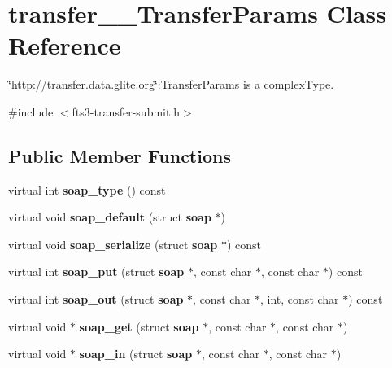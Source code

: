 \section{transfer\_\-\_\-TransferParams Class Reference}
\label{classtransfer____TransferParams}


\char`\"{}http://transfer.data.glite.org\char`\"{}:TransferParams is a complexType.  




{\ttfamily \#include $<$fts3-\/transfer-\/submit.h$>$}

\subsection*{Public Member Functions}
\begin{DoxyCompactItemize}
\item 
virtual int {\bfseries soap\_\-type} () const \label{classtransfer____TransferParams_acca6acc764bd1fe03ef2aefdce8b2e6c}

\item 
virtual void {\bfseries soap\_\-default} (struct {\bf soap} $\ast$)\label{classtransfer____TransferParams_aa85cbcf0c2d7405ef86e9fcbb5e975c4}

\item 
virtual void {\bfseries soap\_\-serialize} (struct {\bf soap} $\ast$) const \label{classtransfer____TransferParams_afb6351523ca0b245c6a085215bd2a15e}

\item 
virtual int {\bfseries soap\_\-put} (struct {\bf soap} $\ast$, const char $\ast$, const char $\ast$) const \label{classtransfer____TransferParams_a9d494d69d5fc18e6641f6bbae96a6cc0}

\item 
virtual int {\bfseries soap\_\-out} (struct {\bf soap} $\ast$, const char $\ast$, int, const char $\ast$) const \label{classtransfer____TransferParams_a18ada0a242ed2166baddfe4967c7c1a2}

\item 
virtual void $\ast$ {\bfseries soap\_\-get} (struct {\bf soap} $\ast$, const char $\ast$, const char $\ast$)\label{classtransfer____TransferParams_a9bd36bdebda7b93d15cf35543d80aaea}

\item 
virtual void $\ast$ {\bfseries soap\_\-in} (struct {\bf soap} $\ast$, const char $\ast$, const char $\ast$)\label{classtransfer____TransferParams_ac7645705dda8399a38e8019adcd3f29d}

\end{DoxyCompactItemize}
